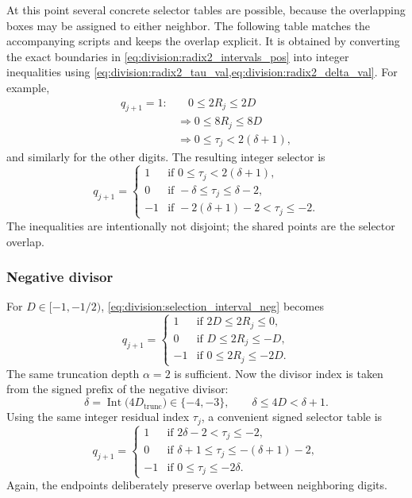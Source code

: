 \documentclass[11pt]{article}
\DeclareMathOperator{\Int}{Int}
\numberwithin{equation}{section}
\begin{document}
At this point several concrete selector tables are possible, because the overlapping boxes may be
assigned to either neighbor.
The following table matches the accompanying scripts and keeps the overlap explicit.
It is obtained by converting the exact boundaries in
\cref{eq:division:radix2_intervals_pos} into integer inequalities using
\cref{eq:division:radix2_tau_val,eq:division:radix2_delta_val}.
For example,
\begin{align*}
  q_{j+1}=1:
  &\quad 0 \le 2R_j \le 2D \\
  &\Longrightarrow 0 \le 8R_j \le 8D \\
  &\Longrightarrow 0 \le \tau_j < 2(\delta+1),
\end{align*}
and similarly for the other digits.
The resulting integer selector is
\begin{equation}
  \label{eq:division:radix2_logic_pos}
  q_{j+1} =
  \begin{cases}
    1  & \text{if } 0 \le \tau_j < 2(\delta+1), \\
    0  & \text{if } -\delta \le \tau_j \le \delta-2, \\
    -1 & \text{if } -2(\delta+1)-2 < \tau_j \le -2.
  \end{cases}
\end{equation}
The inequalities are intentionally not disjoint; the shared points are the selector overlap.

\subsubsection{Negative divisor}
\label{sssec:division:radix2_neg}

For $D \in [-1,-1/2)$, \cref{eq:division:selection_interval_neg} becomes
\begin{equation}
  \label{eq:division:radix2_intervals_neg}
  q_{j+1} =
  \begin{cases}
    1  & \text{if } 2D \le 2R_j \le 0, \\
    0  & \text{if } D \le 2R_j \le -D, \\
    -1 & \text{if } 0 \le 2R_j \le -2D.
  \end{cases}
\end{equation}
The same truncation depth $\alpha=2$ is sufficient.
Now the divisor index is taken from the signed prefix of the negative divisor:
\begin{equation}
  \label{eq:division:radix2_delta_val_neg}
  \delta = \Int\bigl(4D_{\text{trunc}}\bigr) \in \{-4,-3\},
  \qquad
  \delta \le 4D < \delta+1.
\end{equation}
Using the same integer residual index $\tau_j$, a convenient signed selector table is
\begin{equation}
  \label{eq:division:radix2_logic_neg}
  q_{j+1} =
  \begin{cases}
    1  & \text{if } 2\delta-2 < \tau_j \le -2, \\
    0  & \text{if } \delta+1 \le \tau_j \le -(\delta+1)-2, \\
    -1 & \text{if } 0 \le \tau_j \le -2\delta.
  \end{cases}
\end{equation}
Again, the endpoints deliberately preserve overlap between neighboring digits.
\end{document}
